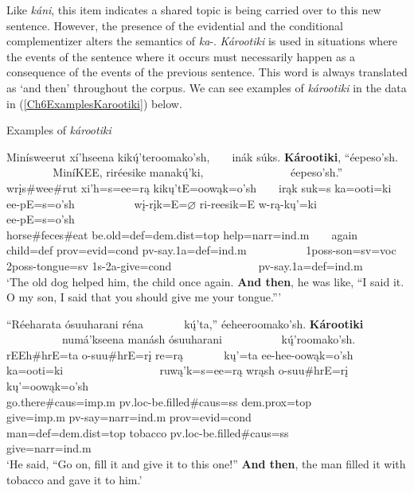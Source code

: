 Like \textit{káni}, this item indicates a shared topic is being carried over to this new sentence. However, the presence of the evidential and the conditional complementizer alters the semantics of \textit{ka}-. \textit{Károotiki} is used in situations where the events of the sentence where it occurs must necessarily happen as a consequence of the events of the previous sentence. This word is always translated as `and then' throughout the corpus. We can see examples of \textit{károotiki} in the data in (\ref{Ch6ExamplesKarootiki}) below.

\begin{exe}
    \item\label{Ch6ExamplesKarootiki} Examples of \textit{károotiki}

    \begin{xlist}
        \item\label{Ch6ExamplesKarootikiA} \glll Minísweerut xí'hseena kikų́'teroomako'sh, ~ ~ inák súks. \textbf{Károotiki}, ``éepeso'sh. ~ ~ ~ ~ ~ ~ MiníKEE, riréesike manakų́'ki, ~ ~ ~ ~ ~ ~ ~ ~ ~ éepeso'sh.''\\
        wrįs\#wee\#rut xi'h=s=ee=rą kikų'tE=oowąk=o'sh ~ ~ irąk suk=s ka=ooti=ki ee-pE=s=o'sh ~ ~ ~ ~ ~ ~ wį-rįk=E=$\varnothing$ ri-reesik=E w-rą-kų'=ki ~ ~ ~ ~ ~ ~ ~ ~ ~ ee-pE=s=o'sh\\
        \textnormal{horse}\#\textnormal{feces}\#\textnormal{eat} \textnormal{be.old}=def=dem.dist=top \textnormal{help}=narr=ind.m ~ ~ \textnormal{again} \textnormal{child}=def prov=evid=cond pv-\textnormal{say}.1a=def=ind.m ~ ~ ~ ~ ~ ~ 1poss-\textnormal{son}=sv=voc 2poss-\textnormal{tongue}=sv 1s-2a-\textnormal{give}=cond ~ ~ ~ ~ ~ ~ ~ ~ ~ pv-\textnormal{say}.1a=def=ind.m\\
        \glt `The old dog helped him, the child once again. \textbf{And then}, he was like, ``I said it. O my son, I said that you should give me your tongue.{''}' \citep[190]{hollow1973a}

        \item\label{Ch6ExamplesKarootikiB} \glll ``Réeharata ósuuharani réna ~ ~ ~ ~ kų́'ta,'' éeheeroomako'sh. \textbf{Károotiki} ~ ~ ~ ~ ~ ~ ~ ~ ~ ~ numá'kseena manásh ósuuharani ~ ~ ~ ~ ~ ~ kų́'roomako'sh.\\
        rEEh\#hrE=ta o-suu\#hrE=rį re=rą ~ ~ ~ ~ kų'=ta ee-hee-oowąk=o'sh ka=ooti=ki ~ ~ ~ ~ ~ ~ ~ ~ ~ ~ ruwą'k=s=ee=rą wrąsh o-suu\#hrE=rį ~ ~ ~ ~ ~ ~ kų'=oowąk=o'sh\\
        \textnormal{go.there}\#caus=imp.m pv.loc-\textnormal{be.filled}\#caus=ss dem.prox=top ~ ~ ~ ~ \textnormal{give}=imp.m pv-\textnormal{say}=narr=ind.m prov=evid=cond ~ ~ ~ ~ ~ ~ ~ ~ ~ ~ \textnormal{man}=def=dem.dist=top \textnormal{tobacco} pv.loc-\textnormal{be.filled}\#caus=ss ~ ~ ~ ~ ~ ~ \textnormal{give}=narr=ind.m\\
        \glt `He said, ``Go on, fill it and give it to this one!'' \textbf{And then}, the man filled it with tobacco and gave it to him.' \citep[175]{hollow1973b}
    \end{xlist}
\end{exe}

